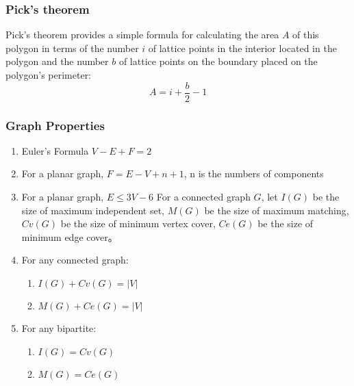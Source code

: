 %

\subsubsection{Pick's theorem}
Pick's theorem provides a simple formula for calculating the area $A$ of this polygon in terms of the number $i$ of lattice points in the interior located in the polygon and the number $b$ of lattice points on the boundary placed on the polygon's perimeter:
$$A = i + \frac{b}{2} - 1$$

\subsubsection{Graph Properties}
\begin{enumerate}\itemsep = -5pt
\item Euler's Formula $V-E+F=2$
\item For a planar graph, $F=E-V+n+1$, n is the numbers of components
\item For a planar graph, $E\leq 3V-6$
For a connected graph $G$, let $I(G)$ be the size of maximum independent set, $M(G)$ be the size of maximum matching, $Cv(G)$ be the size of minimum vertex cover, $Ce(G)$ be the size of minimum edge cover。
\item For any connected graph:
  \begin{enumerate}\itemsep = -3pt
  \item $I(G)+Cv(G)=|V|$
  \item $M(G)+Ce(G)=|V|$
  \end{enumerate}
\item For any bipartite:
  \begin{enumerate}\itemsep = -3pt
  \item $I(G)=Cv(G)$
  \item $M(G)=Ce(G)$

\end{enumerate}
\end{enumerate}
